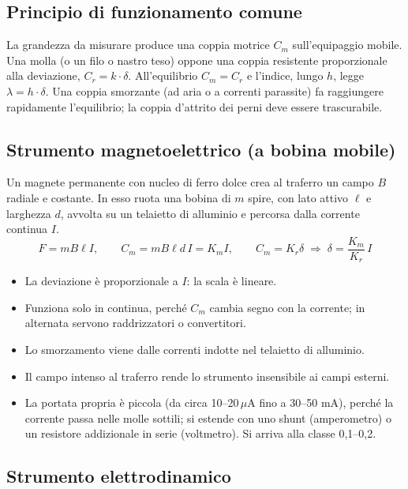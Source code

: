\documentclass[11pt,a4paper]{article}
\begin{document}
\subsection*{Principio di funzionamento comune}

La grandezza da misurare produce una coppia motrice $C_m$ sull'equipaggio mobile. Una molla (o un filo o nastro teso) oppone una coppia resistente proporzionale alla deviazione, $C_r = k\cdot\delta$. All'equilibrio $C_m = C_r$ e l'indice, lungo $h$, legge $\lambda = h\cdot\delta$. Una coppia smorzante (ad aria o a correnti parassite) fa raggiungere rapidamente l'equilibrio; la coppia d'attrito dei perni deve essere trascurabile.

\subsection*{Strumento magnetoelettrico (a bobina mobile)}

Un magnete permanente con nucleo di ferro dolce crea al traferro un campo $B$ radiale e costante. In esso ruota una bobina di $m$ spire, con lato attivo $\ell$ e larghezza $d$, avvolta su un telaietto di alluminio e percorsa dalla corrente continua $I$.
\[
F = m B \ell I, \qquad C_m = m B \ell d\, I = K_m I, \qquad C_m = K_r \delta \;\Rightarrow\; \delta = \frac{K_m}{K_r}\, I
\]
\begin{itemize}
\item La deviazione è proporzionale a $I$: la scala è lineare.
\item Funziona solo in continua, perché $C_m$ cambia segno con la corrente; in alternata servono raddrizzatori o convertitori.
\item Lo smorzamento viene dalle correnti indotte nel telaietto di alluminio.
\item Il campo intenso al traferro rende lo strumento insensibile ai campi esterni.
\item La portata propria è piccola (da circa 10--20\,$\mu$A fino a 30--50 mA), perché la corrente passa nelle molle sottili; si estende con uno shunt (amperometro) o un resistore addizionale in serie (voltmetro). Si arriva alla classe 0,1--0,2.
\end{itemize}

\subsection*{Strumento elettrodinamico}
\end{document}
